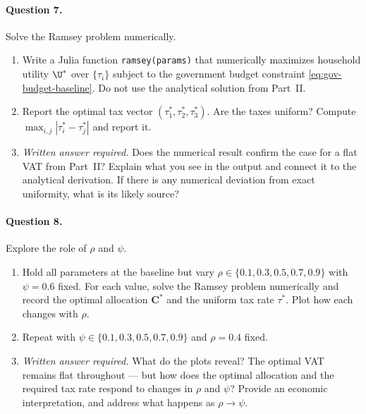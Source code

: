 \paragraph{Question 7.}
Solve the Ramsey problem numerically.
 
\begin{enumerate}[label=(\alph*)]
    \item Write a Julia function \texttt{ramsey(params)} that numerically maximizes household utility $\U^*$ over $\{\tau_i\}$ subject to the government budget constraint \eqref{eq:gov-budget-baseline}. Do not use the analytical solution from Part~II.
 
    \item Report the optimal tax vector $(\tau_1^*, \tau_2^*, \tau_3^*)$. Are the taxes uniform? Compute $\max_{i,j}|\tau_i^* - \tau_j^*|$ and report it.
 
    \item \emph{Written answer required.} Does the numerical result confirm the case for a flat VAT from Part~II? Explain what you see in the output and connect it to the analytical derivation. If there is any numerical deviation from exact uniformity, what is its likely source?
\end{enumerate}
 
\paragraph{Question 8.}
Explore the role of $\rho$ and $\psi$.
 
\begin{enumerate}[label=(\alph*)]
    \item Hold all parameters at the baseline but vary $\rho \in \{0.1, 0.3, 0.5, 0.7, 0.9\}$ with $\psi = 0.6$ fixed. For each value, solve the Ramsey problem numerically and record the optimal allocation $\mathbf{C}^*$ and the uniform tax rate $\tau^*$. Plot how each changes with $\rho$.
 
    \item Repeat with $\psi \in \{0.1, 0.3, 0.5, 0.7, 0.9\}$ and $\rho = 0.4$ fixed.
 
    \item \emph{Written answer required.} What do the plots reveal? The optimal VAT remains flat throughout --- but how does the optimal allocation and the required tax rate respond to changes in $\rho$ and $\psi$? Provide an economic interpretation, and address what happens as $\rho \to \psi$.
\end{enumerate}
 
